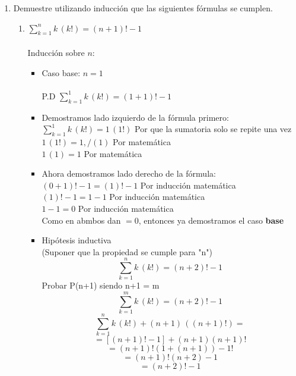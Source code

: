 \documentclass[a4paper,10pt]{article}
\begin{document}
\begin{enumerate}
    \item {} Demuestre utilizando inducci\'on que las siguientes f\'ormulas se cumplen.			
	    \begin{enumerate}
			  \item $\sum\limits_{k=1}^n k\,(k!) = (n+1)!-1$\\\\
        Inducción sobre $n$:
        \begin{itemize}
          \item Caso base: $n = 1$\\\\
            P.D $\sum\limits_{k=1}^1 k\,(k!) = (1+1)!-1$
          \item Demostramos lado izquierdo de la fórmula primero:\\
			      $\sum\limits_{k=1}^1 k\,(k!) = 1\,(1!)$ \hfill Por que la sumatoria solo se repite una vez\\
			      $1\,(1!) = 1,/(1)$ \hfill Por matemática\\
			      $1\,(1) = 1$ \hfill Por matemática\\
          \item Ahora demostramos lado derecho de la fórmula:\\
			      $(0+1)!-1 = (1)!-1$ \hfill Por inducción matemática\\
			      $(1)!-1 = 1-1$ \hfill Por inducción matemática\\
			      $1-1 = 0$ \hfill Por inducción matemática\\
            Como en abmbos dan $=0$, entonces ya demostramos el caso \textbf{base}\\

          \item Hip\'otesis inductiva\\ (Suponer que la propiedad se cumple para "n")
            $$\sum\limits_{k=1}^n k\,(k!) = (n+2)!-1$$
            Probar P(n+1) siendo n+1 = m
            $$\sum\limits_{k=1}^m k\,(k!) = (n+2)!-1$$
            $$\sum\limits_{k=1}^n k\,(k!) + (n+1)\,((n+1)!) = $$
            $$= [(n+1)! - 1] + (n+1)(n+1)!$$
            $$= (n+1)! (1 + (n+1)) -1!$$
            $$= (n+1)! (n + 2) -1$$
            $$= (n+2)! -1$$



\end{itemize}
\end{enumerate}
\end{enumerate}
\end{document}
